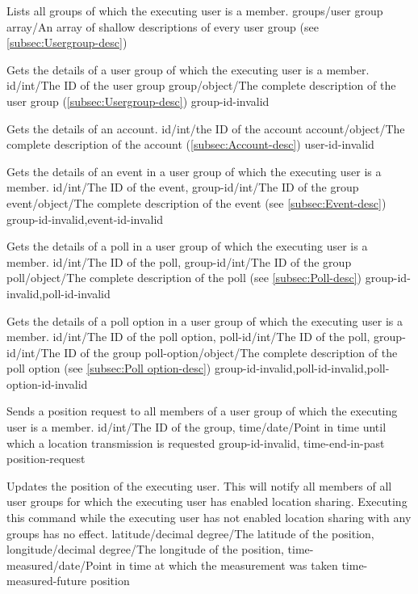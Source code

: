 \documentclass[parskip=full,11pt]{scrartcl}
\begin{document}
{Lists all groups of which the executing user is a member.}
{}
{groups/user group array/An array of shallow descriptions of every user group
(see \ref{subsec:Usergroup-desc})}
{}
{}

{Gets the details of a user group of which the executing user is a member.}
{id/int/The ID of the user group}
{group/object/The complete description of the user group
(\ref{subsec:Usergroup-desc})}
{group-id-invalid}
{}

{Gets the details of an account.}
{id/int/the ID of the account}
{account/object/The complete description of the account
(\ref{subsec:Account-desc})}
{user-id-invalid}
{}

{Gets the details of an event in a user group of which the executing user is
a member.}
{id/int/The ID of the event,
group-id/int/The ID of the group}
{event/object/The complete description of the event (see
\ref{subsec:Event-desc})}
{group-id-invalid,event-id-invalid}
{}

{Gets the details of a poll in a user group of which the executing user is
a member.}
{id/int/The ID of the poll,
group-id/int/The ID of the group}
{poll/object/The complete description of the poll (see \ref{subsec:Poll-desc})}
{group-id-invalid,poll-id-invalid}
{}

{Gets the details of a poll option in a user group of which the executing user
is a member.}
{id/int/The ID of the poll option,
poll-id/int/The ID of the poll,
group-id/int/The ID of the group}
{poll-option/object/The complete description of the poll option
(see \ref{subsec:Poll option-desc})}
{group-id-invalid,poll-id-invalid,poll-option-id-invalid}
{}

{Sends a position request to all members of a user group of which the executing
user is a member.}
{id/int/The ID of the group,
time/date/Point in time until which a location transmission is requested}
{}
{group-id-invalid, time-end-in-past}
{position-request}

{Updates the position of the executing user.
This will notify all members of all user groups for which the executing user
has enabled location sharing.
Executing this command while the executing user has not enabled location
sharing with any groups has no effect.}
{latitude/decimal degree/The latitude of the position,
longitude/decimal degree/The longitude of the position,
time-measured/date/Point in time at which the measurement was taken}
{}
{time-measured-future}
{position}
\end{document}
